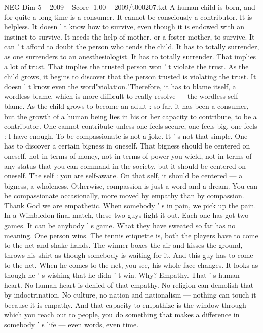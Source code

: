 \begin{textsample}{NEG Dim 5 – 2009 – Score -1.00 – 2009/t000207.txt}  \label{ex:f5_neg_046}
A human child is born, and for quite a long time is a consumer.
It cannot be consciously a contributor.
It is helpless.
It doesn ' t know how to survive, even though it is endowed with an instinct to survive.
It needs the help of mother, or a foster mother, to survive.
It can ' t afford to doubt the person who tends the child.
It has to totally surrender, as one surrenders to an anesthesiologist.
It has to totally surrender.
That implies a lot of trust.
That implies the trusted person won ' t violate the trust.
As the child grows, it begins to discover that the person trusted is violating the trust.
It doesn ' t know even the word"violation."Therefore, it has to blame itself, a wordless blame, which is more difficult to really resolve — the wordless self-blame.
As the child grows to become an adult : so far, it has been a consumer, but the growth of a human being lies in his or her capacity to contribute, to be a contributor.
One cannot contribute unless one feels secure, one feels big, one feels : I have enough.
To be compassionate is not a joke.
It ' s not that simple.
One has to discover a certain bigness in oneself.
That bigness should be centered on oneself, not in terms of money, not in terms of power you wield, not in terms of any status that you can command in the society, but it should be centered on oneself.
The self : you are self-aware.
On that self, it should be centered — a bigness, a wholeness.
Otherwise, compassion is just a word and a dream.
You can be compassionate occasionally, more moved by empathy than by compassion.
Thank God we are empathetic.
When somebody ' s in pain, we pick up the pain.
In a Wimbledon final match, these two guys fight it out.
Each one has got two games.
It can be anybody ' s game.
What they have sweated so far has no meaning.
One person wins.
The tennis etiquette is, both the players have to come to the net and shake hands.
The winner boxes the air and kisses the ground, throws his shirt as though somebody is waiting for it.
And this guy has to come to the net.
When he comes to the net, you see, his whole face changes.
It looks as though he ' s wishing that he didn ' t win.
Why?
Empathy.
That ' s human heart.
No human heart is denied of that empathy.
No religion can demolish that by indoctrination.
No culture, no nation and nationalism — nothing can touch it because it is empathy.
And that capacity to empathize is the window through which you reach out to people, you do something that makes a difference in somebody ' s life — even words, even time.

\end{textsample}
